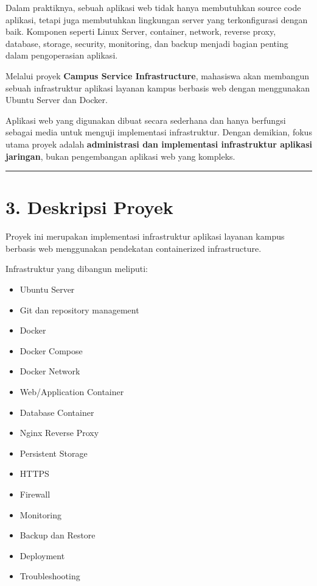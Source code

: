 \documentclass[
]{article}
\providecommand{\tightlist}{%
  \setlength{\itemsep}{0pt}\setlength{\parskip}{0pt}}
\begin{document}
Dalam praktiknya, sebuah aplikasi web tidak hanya membutuhkan source
code aplikasi, tetapi juga membutuhkan lingkungan server yang
terkonfigurasi dengan baik. Komponen seperti Linux Server, container,
network, reverse proxy, database, storage, security, monitoring, dan
backup menjadi bagian penting dalam pengoperasian aplikasi.

Melalui proyek \textbf{Campus Service Infrastructure}, mahasiswa akan
membangun sebuah infrastruktur aplikasi layanan kampus berbasis web
dengan menggunakan Ubuntu Server dan Docker.

Aplikasi web yang digunakan dibuat secara sederhana dan hanya berfungsi
sebagai media untuk menguji implementasi infrastruktur. Dengan demikian,
fokus utama proyek adalah \textbf{administrasi dan implementasi
infrastruktur aplikasi jaringan}, bukan pengembangan aplikasi web yang
kompleks.

\begin{center}\rule{0.5\linewidth}{0.5pt}\end{center}

\section{3. Deskripsi Proyek}\label{deskripsi-proyek}

Proyek ini merupakan implementasi infrastruktur aplikasi layanan kampus
berbasis web menggunakan pendekatan containerized infrastructure.

Infrastruktur yang dibangun meliputi:

\begin{itemize}
\tightlist
\item
  Ubuntu Server
\item
  Git dan repository management
\item
  Docker
\item
  Docker Compose
\item
  Docker Network
\item
  Web/Application Container
\item
  Database Container
\item
  Nginx Reverse Proxy
\item
  Persistent Storage
\item
  HTTPS
\item
  Firewall
\item
  Monitoring
\item
  Backup dan Restore
\item
  Deployment
\item
  Troubleshooting
\end{itemize}
\end{document}
